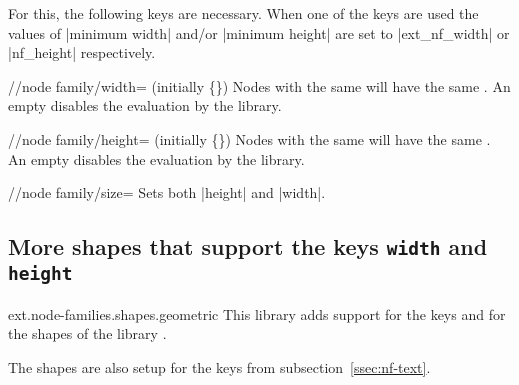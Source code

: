 For this, the following keys are necessary.
When one of the keys are used the values of |minimum width| and/or |minimum height| are set to |ext_nf_width| or |nf_height| respectively.
\begin{key}{/\tikzext/node family/width= (initially \{\})}
Nodes with the same  will have the same .
An empty  disables the evaluation by the library.
\begin{codeexample}[preamble=\usetikzlibrary{positioning,ext.node-families},/tikz/node distance=.5cm]
\tikzexternaldisable %
\end{codeexample}
\end{key}
\begin{key}{/\tikzext/node family/height= (initially \{\})}
Nodes with the same  will have the same .
An empty  disables the evaluation by the library.
\end{key}
\begin{key}{/\tikzext/node family/size=}
Sets both |height| and |width|.
\end{key}

\clearpage
\subsection{More shapes that support the keys \texttt{width} and \texttt{height}}
\begin{tikzlibrary}{ext.node-families.shapes.geometric}
  This library adds support for the keys  and
   for the shapes of
  the \pgfname\space library .

\end{tikzlibrary}
The shapes are also setup for the keys from subsection~\ref{ssec:nf-text}.

\begin{codeexample}[width=9cm,preamble=\usetikzlibrary{ext.node-families.shapes.geometric}]
\tikzexternaldisable %
\end{codeexample}
\endinput